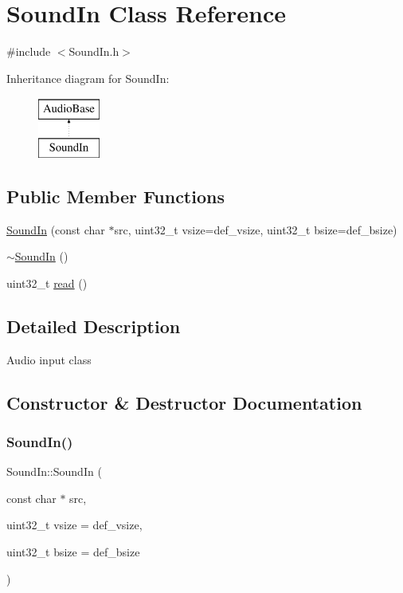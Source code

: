 \hypertarget{class_sound_in}{}\section{Sound\+In Class Reference}
\label{class_sound_in}


{\ttfamily \#include $<$Sound\+In.\+h$>$}

Inheritance diagram for Sound\+In\+:\begin{figure}[H]
\begin{center}
\leavevmode
\includegraphics[height=2.000000cm]{class_sound_in}
\end{center}
\end{figure}
\subsection*{Public Member Functions}
\begin{DoxyCompactItemize}
\item 
\hyperlink{class_sound_in_a30492d30e5a18e2dda866a454779c210}{Sound\+In} (const char $\ast$src, uint32\+\_\+t vsize=def\+\_\+vsize, uint32\+\_\+t bsize=def\+\_\+bsize)
\item 
\hyperlink{class_sound_in_ac72a498714e161d1d691821f1214f2f3}{$\sim$\+Sound\+In} ()
\item 
uint32\+\_\+t \hyperlink{class_sound_in_adef1afd60041390537e1f3cef1e5a282}{read} ()
\end{DoxyCompactItemize}


\subsection{Detailed Description}
Audio input class 

\subsection{Constructor \& Destructor Documentation}
\mbox{\label{class_sound_in_a30492d30e5a18e2dda866a454779c210}} 
\subsubsection{\texorpdfstring{Sound\+In()}{SoundIn()}}
{\footnotesize\ttfamily Sound\+In\+::\+Sound\+In (\begin{DoxyParamCaption}\item[{const char $\ast$}]{src,  }\item[{uint32\+\_\+t}]{vsize = {\ttfamily def\+\_\+vsize},  }\item[{uint32\+\_\+t}]{bsize = {\ttfamily def\+\_\+bsize} }\end{DoxyParamCaption})}


